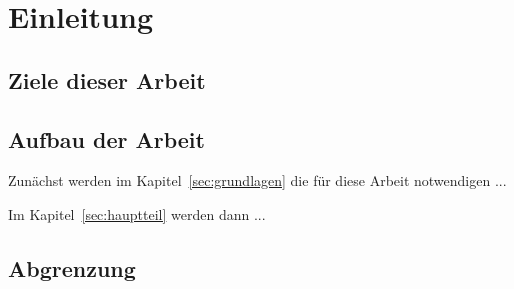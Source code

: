 \section{Einleitung}
\label{sec:einleitung}


\subsection{Ziele dieser Arbeit}


\subsection{Aufbau der Arbeit}

Zunächst werden im Kapitel~\ref{sec:grundlagen} die für diese Arbeit notwendigen ...

Im Kapitel~\ref{sec:hauptteil} werden dann ...

\subsection{Abgrenzung}

